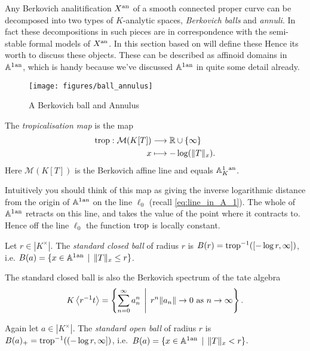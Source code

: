 Any Berkovich analitification $X{}^{\text{an}}$ of a smooth connected proper curve can be decomposed into two types of $K$-analytic spaces, \emph{Berkovich balls} and \emph{annuli}.
In fact these decompositions in such pieces are in correspondence with the semi-stable formal models of $X{}^{\text{an}}$. 
In this section based on \cite[sec.\ 2]{bakerStructureNonarchimedeanAnalytic2013} will define these  
Hence its worth to discuss these objects. 
These can be described as affinoid domains in $\mathbb{A}^{1}{}^{\text{an}}$, which is handy because we've discussed $\mathbb{A}^{1}{}^{\text{an}}$ in quite some detail already.  
\begin{figure}[h]
	\centering
	\texttt{[image: figures/ball\_annulus]}
	\caption{A Berkovich ball and Annulus}
	\label{fig:ball_annulus}
\end{figure}
\begin{definition}
	The \emph{tropicalisation map} is the map 
	\begin{align*}
		\operatorname{trop} :  \mathcal{M} (K[T]) &\longrightarrow \mathbb{R} \cup \{\infty\}  \\
		x &\longmapsto -\log( \|T\|_x)
	.\end{align*}
	Here $\mathcal{M} (K[T])$ is the Berkovich affine line and equals $\mathbb{A}^{1}_K{}^{\text{an}}$. 
\end{definition}
Intuitively you should think of this map as giving the inverse logarithmic distance from the origin of $\mathbb{A}^{1}{}^{\text{an}}$ on the line $\ell_0$ (recall \cref{eq:line_in_A_1}).  
The whole of $\mathbb{A}^{1}{}^{\text{an}} $ retracts on this line, and takes the value of the point where it contracts to. Hence off the line $\ell_0$ the function $\operatorname{trop}$ is locally constant. 



\begin{definition}
	Let $r \in |K^{\times }|$. The \emph{standard closed ball} of radius $r$ is $B(r) = \operatorname{trop}^{-1}([-\log r, \infty])$, i.e. $B(a) = \{x \in \aff^{1}\an \st \|T\|_x \le r\} $. 
\end{definition}
The standard closed ball is also the Berkovich spectrum of the tate algebra \[
K\left<r^{-1}t \right> = \left\{\sum_{n = 0}^{\infty} a_n ^{n} \st r ^{n} \|a_n\| \to 0 \text{ as } n \to \infty \right\} 
.\] 
\begin{definition}
	Again let $a \in |K^{\times }|$. 
	The \emph{standard open ball} of radius $r$ is $B(a)_+ = \operatorname{trop}^{-1}((-\log r, \infty])$, i.e.\ $B(a) = \{x \in \aff^{1}\an \st \|T\|_x <  r\} $.
\end{definition}

